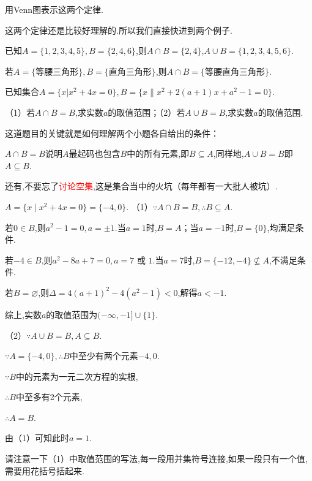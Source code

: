 \documentclass[lang=cn,math=cm,chinesefont=nofont,11pt,scheme=chinese,twocol]{elegantbook}
\begin{document}
\begin{exercise}\label{exer:10}
  用Venn图表示这两个定律.
\end{exercise}

这两个定律还是比较好理解的.所以我们直接快进到两个例子.

\begin{example}
  已知$A=\{1,2,3,4,5\},B=\{2,4,6\}$,则$A\cap B=\{2,4\}$,$A\cup B=\{1,2,3,4,5,6\}$.
\end{example}

\begin{example}
  若$A=\{\text{等腰三角形}\},B=\{\text{直角三角形}\}$,则$A\cap B=\{\text{等腰直角三角形}\}.$
\end{example}

\begin{example}
  已知集合$A=\{x|x^{2}+4x=0\},B=\{x\|x^{2}+2(a+1)x+a^{2}-1=0\}.$

  （1）若$A\cap B=B$,求实数$a$的取值范围；（2）若$A\cup B=B$,求实数$a$的取值范围.
\end{example}
\begin{remark}
  这道题目的关键就是如何理解两个小题各自给出的条件：

  $A\cap B=B$说明$A$最起码也包含$B$中的所有元素,即$B\subseteq A$,同样地,$A\cup B=B$即$A\subseteq B$.

  还有,不要忘了\textcolor{red}{讨论空集},这是集合当中的火坑（每年都有一大批人被坑）.
\end{remark}
\begin{solution}
  $A=\{x\mid x^{2}+4x=0\}=\{-4,0\}.$
  （1）$\because A\cap B=B,$\enspace$\therefore B\subseteq A.$
  
  若$0\in B$,则$a^2-1=0,a=\pm 1.$当$a=1$时,$B=A$；当$a=-1$时,$B=\{0\}$,均满足条件.

  若$-4\in B$,则$a^2-8a+7=0,a=7\text{ 或 }1.$当$a=7$时,$B=\{-12,-4\}\nsubseteq A$,不满足条件.

  若$B=\varnothing$,则$\Delta=4(a+1)^{2}-4(a^{2}-1)<0$,解得$a<-1$.

  综上,实数$a$的取值范围为$(-\infty,-1]\cup\{1\}.$

  （2）$\because A\cup B=B,$\enspace$A\subseteq B.$

  $\because A=\{-4,0\},$\enspace$\therefore B$中至少有两个元素$-4,0.$

  $\because B$中的元素为一元二次方程的实根,

  $\therefore B$中至多有2个元素,

  $\therefore A=B.$

  由（1）可知此时$a=1$.
\end{solution}
\begin{remark}
  请注意一下（1）中取值范围的写法,每一段用并集符号连接,如果一段只有一个值,需要用花括号括起来.
\end{remark}
\end{document}
